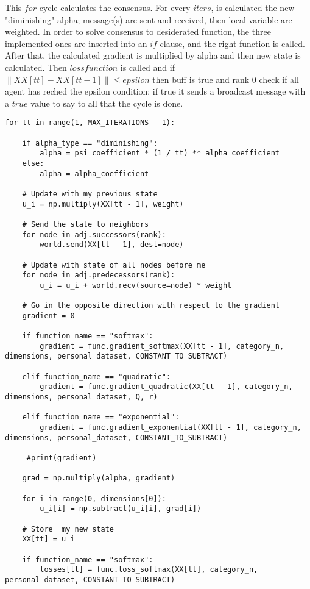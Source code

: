 \documentclass[a4paper,11pt,oneside]{book}
\begin{document}
This $for$ cycle calculates the consensus. For every $iters$, is calculated the new "diminishing" alpha; message(s) are sent
and received, then local variable are weighted. In order to solve consensus to desiderated function, the three implemented
ones are inserted into an $if$ clause, and the right function is called. After that, the calculated gradient is multiplied by
alpha and then new state is calculated. Then $loss function$ is called and if $\left\lVert XX[tt] - XX[tt-1] \right\rVert
\leq epsilon$ then buff is true and rank 0 check if all agent has reched the epsilon condition; if true it sends a broadcast 
message with a $true$ value to say to all that the cycle is done.

\begin{lstlisting}
for tt in range(1, MAX_ITERATIONS - 1):

    if alpha_type == "diminishing":
        alpha = psi_coefficient * (1 / tt) ** alpha_coefficient
    else:
        alpha = alpha_coefficient

    # Update with my previous state
    u_i = np.multiply(XX[tt - 1], weight)

    # Send the state to neighbors
    for node in adj.successors(rank):
        world.send(XX[tt - 1], dest=node)

    # Update with state of all nodes before me
    for node in adj.predecessors(rank):
        u_i = u_i + world.recv(source=node) * weight

    # Go in the opposite direction with respect to the gradient
    gradient = 0

    if function_name == "softmax":
        gradient = func.gradient_softmax(XX[tt - 1], category_n, dimensions, personal_dataset, CONSTANT_TO_SUBTRACT)

    elif function_name == "quadratic":
        gradient = func.gradient_quadratic(XX[tt - 1], category_n, dimensions, personal_dataset, Q, r)

    elif function_name == "exponential":
        gradient = func.gradient_exponential(XX[tt - 1], category_n, dimensions, personal_dataset, CONSTANT_TO_SUBTRACT)

     #print(gradient)

    grad = np.multiply(alpha, gradient)

    for i in range(0, dimensions[0]):
        u_i[i] = np.subtract(u_i[i], grad[i])

    # Store  my new state
    XX[tt] = u_i

    if function_name == "softmax":
        losses[tt] = func.loss_softmax(XX[tt], category_n, personal_dataset, CONSTANT_TO_SUBTRACT)


\end{lstlisting}
\end{document}
